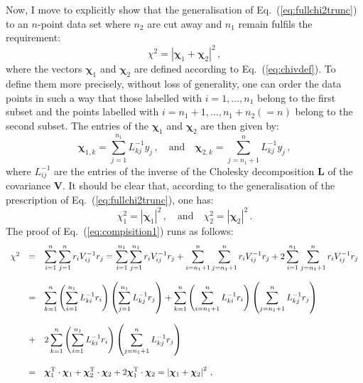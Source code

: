 \documentclass[10pt,a4paper]{article}
\begin{document}
Now, I move to explicitly show that the generalisation of
Eq.~(\ref{eq:fullchi2trunc}) to an $n$-point data set where $n_2$ are
cut away and $n_1$ remain fulfils the requirement:
\begin{equation}\label{eq:compisition1}
  \chi^2 = \left|{\bm \chi}_1+{\bm \chi}_2\right|^2\,,
\end{equation}
where the vectors ${\bm \chi}_1$ and ${\bm \chi}_2$ are defined
according to Eq.~(\ref{eq:chivdef}). To define them more precisely,
without loss of generality, one can order the data points in such a
way that those labelled with $i=1,\dots,n_1$ belong to the first
subset and the points labelled with $i=n_1+1,\dots,n_1+n_2(=n)$ belong
to the second subset. The entries of the ${\bm \chi}_1$ and ${\bm
  \chi}_2$ are then given by:
\begin{equation}
\bm \chi_{1,k} = \sum_{j=1}^{n_1} L_{kj}^{-1}y_j\,,\quad\mbox{and}\quad
\bm \chi_{2,k} = \sum_{j=n_1+1}^{n} L_{kj}^{-1}y_j\,,
\end{equation}
where $L_{ij}^{-1}$ are the entries of the inverse of the Cholesky
decomposition $\mathbf{L}$ of the covariance $\mathbf{V}$. It should
be clear that, according to the generalisation of the prescription of
Eq.~(\ref{eq:fullchi2trunc}), one has:
\begin{equation}
\chi_1^2= \left|\bm \chi_{1}\right|^2\,,\quad\mbox{and}\quad \chi_2^2= \left|\bm \chi_{2}\right|^2\,.
\end{equation}
The proof of Eq.~(\ref{eq:compisition1}) runs as follows:
\begin{equation}\label{eq:combinechi2s}
\begin{array}{rcl}
  \chi^2 &=&\displaystyle 
             \sum_{i=1}^n\sum_{j=1}^nr_iV_{ij}^{-1}r_j=\sum_{i=1}^{n_1}\sum_{j=1}^{n_1}r_iV_{ij}^{-1}r_j
             + \sum_{i=n_1+1}^{n}\sum_{j=n_1+1}^{n}r_iV_{ij}^{-1}r_j+2
             \sum_{i=1}^{n_1}\sum_{j=n_1+1}^{n}r_iV_{ij}^{-1}r_j\\
  \\
         &=& \displaystyle \sum_{k=1}^{n}\left(\sum_{i=1}^{n_1}L^{-1}_{ki}r_i\right)\left(\sum_{j=1}^{n_1}L^{-1}_{kj}r_j\right)
             +
             \sum_{k=1}^{n}\left(\sum_{i=n_1+1}^{n}L^{-1}_{ki}r_i\right)\left(\sum_{j=n_1+1}^{n}L^{-1}_{kj}r_j\right)\\
\\
 &+&\displaystyle 2
             \sum_{k=1}^n\left(\sum_{i=1}^{n_1}L_{ki}^{-1}r_i\right)\left(\sum_{j=n_1+1}^{n}L_{kj}^{-1}r_j\right)\\
  \\
         &=&\displaystyle {\bm \chi}_1^{\rm T}\cdot{\bm \chi}_1+{\bm \chi}_2^{\rm T}\cdot{\bm \chi}_2 +2
             {\bm \chi}_1^{\rm T}\cdot{\bm \chi}_2 =\left|{\bm \chi}_1+{\bm \chi}_2\right|^2\,,
\end{array}
\end{equation}
\end{document}
